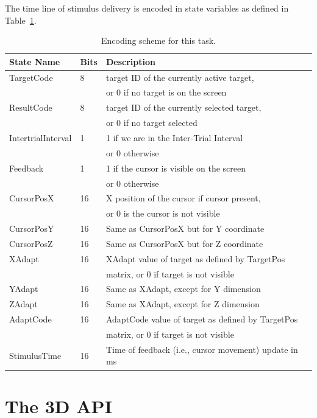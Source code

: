 \documentclass[letterpaper,oneside,12pt]{article}
\begin{document}
The time line of stimulus delivery is encoded in state variables as defined in
Table~\ref{tab:states}.
\begin{table}
\begin{center}
\begin{tabular}[ht]{|l|l|l|}
\hline
\bf{State Name}& \bf{Bits}            & \bf{Description} \\
\hline
\hline
 TargetCode & 8 & target ID of the currently active target, \\
            &   & or 0 if no target is on the screen \\
 ResultCode & 8 & target ID of the currently selected target, \\
            &   & or 0 if no target selected \\
 IntertrialInterval & 1 & 1 if we are in the Inter-Trial Interval \\
            &   & or 0 otherwise \\
 Feedback   & 1 & 1 if the cursor is visible on the screen \\
            &   & or 0 otherwise \\
 CursorPosX & 16 & X position of the cursor if cursor present, \\
            &   & or 0 is the cursor is not visible \\
 CursorPosY & 16 & Same as CursorPosX but for Y coordinate \\
 CursorPosZ & 16 & Same as CursorPosX but for Z coordinate \\
 XAdapt     & 16 & XAdapt value of target as defined by TargetPos \\
            &    & matrix, or 0 if target is not visible \\
 YAdapt     & 16 & Same as XAdapt, except for Y dimension \\
 ZAdapt     & 16 & Same as XAdapt, except for Z dimension \\
 AdaptCode  & 16 & AdaptCode value of target as defined by TargetPos \\
            &    & matrix, or 0 if target is not visible \\
 StimulusTime & 16 & Time of feedback (i.e., cursor movement) update in ms \\
\hline
\end{tabular}
\caption{Encoding scheme for this task.}
\label{tab:states}
\end{center}
\end{table}

\newpage
\section{The 3D API}
\end{document}
